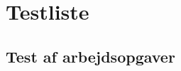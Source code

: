 \section{Testliste}
\label{App_Test_ListOfTest}

\subsection{Test af arbejdsopgaver}
\label{App_Test_ListOfTest_Work}
